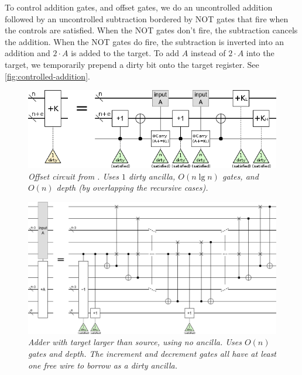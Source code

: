\documentclass[twocolumn]{article}
\begin{document}
To control addition gates, and offset gates, we do an uncontrolled addition followed by an uncontrolled subtraction bordered by NOT gates that fire when the controls are satisfied.
When the NOT gates don't fire, the subtraction cancels the addition.
When the NOT gates do fire, the subtraction is inverted into an addition and $2 \cdot A$ is added to the target.
To add $A$ instead of $2 \cdot A$ into the target, we temporarily prepend a dirty bit onto the target register.
See \ref{fig:controlled-addition}.

\begin{figure}
  \centering
  \includegraphics[width=\linewidth]{assets/offset.png}
  \caption{\em
      Offset circuit from \cite{haner2016}.
      Uses $1$ dirty ancilla, $O(n \lg n)$ gates, and $O(n)$ depth (by overlapping the recursive cases).
  }
  \label{fig:offset}
\end{figure}

\begin{figure}
  \centering
  \includegraphics[width=\linewidth]{assets/inline-adder-into-large.png}
  \caption{\em
      Adder with target larger than source, using no ancilla.
      Uses $O(n)$ gates and depth.
      The increment and decrement gates all have at least one free wire to borrow as a dirty ancilla.
  }
  \label{fig:inline-adder-into-large}
\end{figure}
\end{document}
